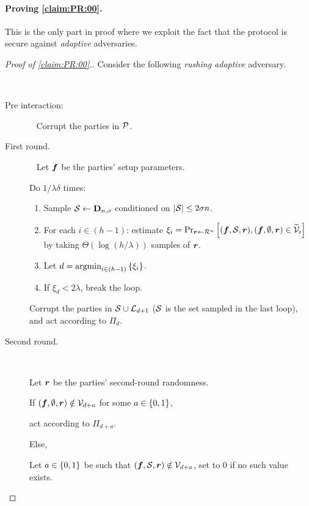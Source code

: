 \paragraph{Proving \cref{claim:PR:00}.}
This is the only part in proof where we exploit the fact that the protocol is secure against \emph{adaptive} adversaries.
\begin{proof}[Proof of \cref{claim:PR:00}.]
	

Consider the following \emph{rushing adaptive} adversary.

{ \samepage
\begin{algorithm}[$\Ac$]\label{alg:PR:00}~
		
\begin{description}
	
\item[Pre interaction:]~
Corrupt the parties in $\mathcal{P}$.

\item[First round.] ~
Let ${ \boldsymbol{f}}$ be the parties' setup parameters.

Do $1/\lambda\delta$ times:
\begin{enumerate}
	\item  Sample  $\mathcal{S} \gets \mathbf{D}_{n,\sigma} $ conditioned on $ \left|{\cal{S}}\right| \le 2\sigma n$.
	\item  	For each   $i\in (h-1)$: estimate $\xi_i =  \Pr_{{ \boldsymbol{r}} \gets \mathcal{R}^n}\left[({ \boldsymbol{f}},{\cal{S}},{ \boldsymbol{r}}),({ \boldsymbol{f}},\emptyset,{ \boldsymbol{r}})  \in \widetilde{\mathcal{V}}_{i}\right]$ by taking $\Theta( \log (h/ \lambda))$ samples of ${ \boldsymbol{r}}$.
	
	\item Let $d = \operatorname*{argmin}_{i\in (h-1)} \left\{\xi_i\right\}$.
			
	\item If $\xi_d < 2\lambda$, break the loop.

\end{enumerate}
			
        Corrupt the parties in ${\cal{S}} \cup {\cal{L}}_{d+1}$ (${\cal{S}}$ is the set sampled in the last loop), and act according to $\Pi_d$.
		
		\item[Second round.]~
		
		Let ${ \boldsymbol{r}}$ be the parties' second-round randomness.
		
		
		If $({ \boldsymbol{f}},\emptyset,{ \boldsymbol{r}}) \notin \mathcal{V}_{d+a}$ for some $a\in \{0,1\}$,
		
		\quad act according to $\Pi_{d+a}$.
		
		Else,
		
		\quad Let $a\in \{0,1\}$ be such that $({ \boldsymbol{f}},{\cal{S}},{ \boldsymbol{r}}) \notin \mathcal{V}_{d+a}$, set to $0$ if no such value exists.
		

\end{description}
\end{algorithm}}
\end{proof}
